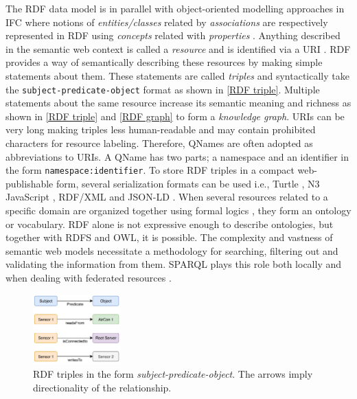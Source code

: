 The \ac{RDF} data model \citep{Manola2014} is in parallel with object-oriented modelling approaches in \ac{IFC} where notions of \emph{entities/classes} related by \emph{associations} are respectively represented in \ac{RDF} using \emph{concepts} related with \emph{properties} \citep{Pauwels2016}. Anything described in the semantic web context is called a \emph{resource} and is identified via a \ac{URI}  \citep{Studer2007}. \ac{RDF} provides a way of semantically describing these resources by making simple statements about them. These statements are called \emph{triples} and syntactically take the \texttt{subject-predicate-object} format \citep{Manola2014} as shown in \autoref{RDF triple}. Multiple statements about the same resource increase its semantic meaning and richness as shown in \autoref{RDF triple} and \autoref{RDF graph} to form a \textit{knowledge graph}. \acp{URI} can be very long making triples less human-readable and may contain
prohibited characters for resource labeling. Therefore, \acp{QName} are often adopted as abbreviations to \acp{URI}. A \ac{QName} has two parts; a namespace and
an identifier in the form \texttt{namespace:identifier}. To store \ac{RDF}
triples in a compact web-publishable form, several serialization formats can be used i.e., Turtle \citep{Beckett2011}, N3 JavaScript \citep{Berners-Lee2011}, RDF/XML \citep{Beckett2014} and JSON-LD \citep{Kellogg2019}. When several resources related to a specific domain are organized together using formal logics \citep{Baader2003, Hitzler2012, W3COWLWorkingGroup2012}, they form an ontology or vocabulary. \ac{RDF} alone is not expressive enough to describe ontologies, but together with \ac{RDFS} and \ac{OWL}, it is possible. The complexity and vastness of semantic web models necessitate a methodology for searching, filtering out and validating the information from them. \ac{SPARQL} plays this role both locally and when dealing with federated resources \citep{Harris2013, W3CSPARQLWorkingGroup2013}.
\begin{figure}[!t]
	\centering
	\includegraphics[width=0.3\textwidth]{figures/RDFtriple}
	\caption{RDF triples in the form \emph{subject-predicate-object}. The arrows imply directionality of the relationship.} 
	\label{RDF triple}
\end{figure}

